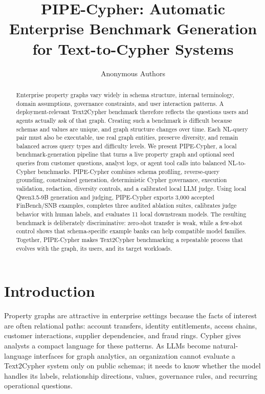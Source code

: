 \documentclass[11pt]{article}
\title{PIPE-Cypher: Automatic Enterprise Benchmark Generation for Text-to-Cypher Systems}
\author{Anonymous Authors}
\begin{document}
\maketitle
\thispagestyle{firstpagefooter}

\begin{abstract}
Enterprise property graphs vary widely in schema structure, internal terminology, domain assumptions, governance constraints, and user interaction patterns. A deployment-relevant Text2Cypher benchmark therefore reflects the questions users and agents actually ask of that graph. Creating such a benchmark is difficult because schemas and values are unique, and graph structure changes over time. Each NL-query pair must also be executable, use real graph entities, preserve diversity, and remain balanced across query types and difficulty levels. We present PIPE-Cypher, a local benchmark-generation pipeline that turns a live property graph and optional seed queries from customer questions, analyst logs, or agent tool calls into balanced NL-to-Cypher benchmarks. PIPE-Cypher combines schema profiling, reverse-query grounding, constrained generation, deterministic Cypher governance, execution validation, redaction, diversity controls, and a calibrated local LLM judge. Using local Qwen3.5-9B generation and judging, PIPE-Cypher exports 3,000 accepted FinBench/SNB examples, completes three audited ablation suites, calibrates judge behavior with human labels, and evaluates 11 local downstream models. The resulting benchmark is deliberately discriminative: zero-shot transfer is weak, while a few-shot control shows that schema-specific example banks can help compatible model families. Together, PIPE-Cypher makes Text2Cypher benchmarking a repeatable process that evolves with the graph, its users, and its target workloads.
\end{abstract}

\section{Introduction}
Property graphs are attractive in enterprise settings because the facts of interest are often relational paths: account transfers, identity entitlements, access chains, customer interactions, supplier dependencies, and fraud rings. Cypher gives analysts a compact language for these patterns. As LLMs become natural-language interfaces for graph analytics, an organization cannot evaluate a Text2Cypher system only on public schemas; it needs to know whether the model handles its labels, relationship directions, values, governance rules, and recurring operational questions.
\end{document}
